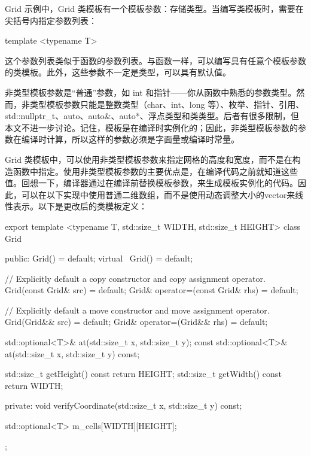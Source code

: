 
Grid 示例中，Grid 类模板有一个模板参数：存储类型。当编写类模板时，需要在尖括号内指定参数列表：

\begin{cpp}
template <typename T>
\end{cpp}

这个参数列表类似于函数的参数列表。与函数一样，可以编写具有任意个模板参数的类模板。此外，这些参数不一定是类型，可以具有默认值。


非类型模板参数是“普通”参数，如 int 和指针——你从函数中熟悉的参数类型。然而，非类型模板参数只能是整数类型（char、int、long 等）、枚举、指针、引用、std::nullptr\_t、auto、auto\&、auto*、浮点类型和类类型。后者有很多限制，但本文不进一步讨论。记住，模板是在编译时实例化的；因此，非类型模板参数的参数在编译时计算，所以这样的参数必须是字面量或编译时常量。

Grid 类模板中，可以使用非类型模板参数来指定网格的高度和宽度，而不是在构造函数中指定。使用非类型模板参数的主要优点是，在编译代码之前就知道这些值。回想一下，编译器通过在编译前替换模板参数，来生成模板实例化的代码。因此，可以在以下实现中使用普通二维数组，而不是使用动态调整大小的vector来线性表示。以下是更改后的类模板定义：

\begin{cpp}
export template <typename T, std::size_t WIDTH, std::size_t HEIGHT>
class Grid
{
    public:
        Grid() = default;
        virtual ~Grid() = default;

        // Explicitly default a copy constructor and copy assignment operator.
        Grid(const Grid& src) = default;
        Grid& operator=(const Grid& rhs) = default;

        // Explicitly default a move constructor and move assignment operator.
        Grid(Grid&& src) = default;
        Grid& operator=(Grid&& rhs) = default;

        std::optional<T>& at(std::size_t x, std::size_t y);
        const std::optional<T>& at(std::size_t x, std::size_t y) const;

        std::size_t getHeight() const { return HEIGHT; }
        std::size_t getWidth() const { return WIDTH; }

    private:
        void verifyCoordinate(std::size_t x, std::size_t y) const;

        std::optional<T> m_cells[WIDTH][HEIGHT];
};
\end{cpp}

